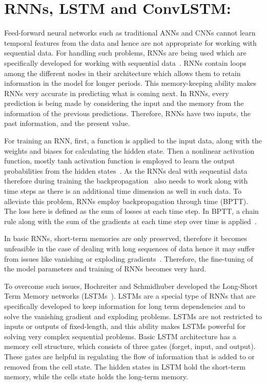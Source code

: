 \section{RNNs, LSTM and ConvLSTM:}
Feed-forward neural networks such as traditional ANNs and CNNs cannot learn temporal features from the data and hence are not appropriate for working with sequential data.
For handling such problems, RNNs are being used which are specifically developed for working with sequential data~\cite{aggarwal2018neural, lecun2015deep, bengio2017deep}. 
RNNs contain loops among the different nodes in their architecture which allows them to retain information in the model for longer periods.
This memory-keeping ability makes RNNs very accurate in predicting what is coming next.
In RNNs, every prediction is being made by considering the input and the memory from the information of the previous predictions.
Therefore, RNNs have two inputs, the past information, and the present value.

For training an RNN, first, a function is applied to the input data, along with the weights and biases for calculating the hidden state.
Then a nonlinear activation function, mostly tanh activation function is employed to learn the output probabilities from the hidden states~\cite{aggarwal2018neural}.
As the RNNs deal with sequential data therefore during training the backpropagation~\cite{rumelhart1986learning} also needs to work along with time steps as there is an additional time dimension as well in such data.
To alleviate this problem, RNNs employ backpropagation through time (BPTT). 
The loss here is defined as the sum of losses at each time step. 
In BPTT, a chain rule along with the sum of the gradients at
each time step over time is applied~\cite{aggarwal2018neural}.

In basic RNNs, short-term memories are only preserved, therefore it becomes unfeasible in the case of dealing with long sequences of data hence it may suffer from issues like vanishing or exploding gradients~\cite{bengio1994learning}.
Therefore, the fine-tuning of the model parameters and training of RNNs becomes very hard.

To overcome such issues, Hochreiter and Schmidhuber developed the Long-Short Term Memory networks (LSTMs~\cite{hochreiter1997long}).
LSTMs are a special type of RNNs that are specifically developed to keep information for long term dependencies and to solve the vanishing gradient and exploding problems.
LSTMs are not restricted to inputs or outputs of fixed-length, and this ability makes LSTMs powerful for solving very complex sequential problems. 
Basic LSTM architecture has a memory cell structure, which consists of three gates (forget, input, and output). 
These gates are helpful in regulating the flow of information that is added to or removed from the cell state. 
The hidden states in LSTM hold the short-term memory, while the cells state holds the long-term memory. 

